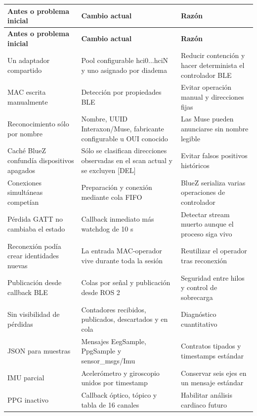 \documentclass[11pt,a4paper]{article}
\begin{document}
\begin{longtable}{@{}>{\raggedright\arraybackslash}p{}>{\raggedright\arraybackslash}p{}>{\raggedright\arraybackslash}p{}@{}}
\toprule
\textbf{Antes o problema inicial} & \textbf{Cambio actual} & \textbf{Razón} \\
\midrule
\endfirsthead
\toprule
\textbf{Antes o problema inicial} & \textbf{Cambio actual} & \textbf{Razón} \\
\midrule
\endhead
Un adaptador compartido & Pool configurable {\ttfamily\small hci0...hciN} y uno asignado por diadema & Reducir contención y hacer determinista el controlador BLE \\
MAC escrita manualmente & Detección por propiedades BLE & Evitar operación manual y direcciones fijas \\
Reconocimiento sólo por nombre & Nombre, UUID Interaxon/Muse, fabricante configurable u OUI conocido & Las Muse pueden anunciarse sin nombre legible \\
Caché BlueZ confundía dispositivos apagados & Sólo se clasifican direcciones observadas en el scan actual y se excluyen {\ttfamily\small [DEL]} & Evitar falsos positivos históricos \\
Conexiones simultáneas competían & Preparación y conexión mediante cola FIFO & BlueZ serializa varias operaciones de controlador \\
Pérdida GATT no cambiaba el estado & Callback inmediato más watchdog de 10 s & Detectar stream muerto aunque el proceso siga vivo \\
Reconexión podía crear identidades nuevas & La entrada MAC-operador vive durante toda la sesión & Reutilizar el operador tras reconexión \\
Publicación desde callback BLE & Colas por señal y publicación desde ROS 2 & Seguridad entre hilos y control de sobrecarga \\
Sin visibilidad de pérdidas & Contadores recibidos, publicados, descartados y en cola & Diagnóstico cuantitativo \\
JSON para muestras & Mensajes {\ttfamily\small EegSample}, {\ttfamily\small PpgSample} y {\ttfamily\small sensor\_msgs/Imu} & Contratos tipados y timestamps estándar \\
IMU parcial & Acelerómetro y giroscopio unidos por timestamp & Conservar seis ejes en un mensaje estándar \\
PPG inactivo & Callback óptico, tópico y tabla de 16 canales & Habilitar análisis cardiaco futuro \\

\end{longtable}
\end{document}
